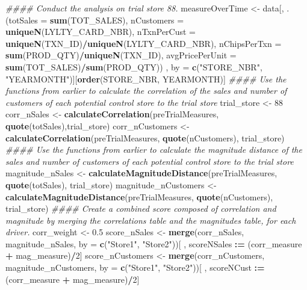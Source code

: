 \documentclass[
]{article}
\newenvironment{Shaded}{\begin{snugshade}}{\end{snugshade}}
\newcommand{\CommentTok}[1]{\textcolor[rgb]{0.56,0.35,0.01}{\textit{#1}}}
\newcommand{\DataTypeTok}[1]{\textcolor[rgb]{0.13,0.29,0.53}{#1}}
\newcommand{\DecValTok}[1]{\textcolor[rgb]{0.00,0.00,0.81}{#1}}
\newcommand{\ErrorTok}[1]{\textcolor[rgb]{0.64,0.00,0.00}{\textbf{#1}}}
\newcommand{\FloatTok}[1]{\textcolor[rgb]{0.00,0.00,0.81}{#1}}
\newcommand{\KeywordTok}[1]{\textcolor[rgb]{0.13,0.29,0.53}{\textbf{#1}}}
\newcommand{\NormalTok}[1]{#1}
\newcommand{\OperatorTok}[1]{\textcolor[rgb]{0.81,0.36,0.00}{\textbf{#1}}}
\newcommand{\StringTok}[1]{\textcolor[rgb]{0.31,0.60,0.02}{#1}}
\begin{document}
\begin{Shaded}
\begin{Highlighting}[]
\CommentTok{#### Conduct the analysis on trial store 88.}
\NormalTok{measureOverTime <-}\StringTok{ }\NormalTok{data[, .(}\DataTypeTok{totSales =} \KeywordTok{sum}\NormalTok{(TOT_SALES),}
\DataTypeTok{nCustomers =} \KeywordTok{uniqueN}\NormalTok{(LYLTY_CARD_NBR),}
\DataTypeTok{nTxnPerCust =} \KeywordTok{uniqueN}\NormalTok{(TXN_ID)}\OperatorTok{/}\KeywordTok{uniqueN}\NormalTok{(LYLTY_CARD_NBR),}
\DataTypeTok{nChipsPerTxn =} \KeywordTok{sum}\NormalTok{(PROD_QTY)}\OperatorTok{/}\KeywordTok{uniqueN}\NormalTok{(TXN_ID),}
\DataTypeTok{avgPricePerUnit =} \KeywordTok{sum}\NormalTok{(TOT_SALES)}\OperatorTok{/}\KeywordTok{sum}\NormalTok{(PROD_QTY))}
\NormalTok{, by =}\StringTok{ }\KeywordTok{c}\NormalTok{(}\StringTok{"STORE_NBR"}\NormalTok{, }\StringTok{"YEARMONTH"}\NormalTok{)][}\KeywordTok{order}\NormalTok{(STORE_NBR, YEARMONTH)]}
\CommentTok{#### Use the functions from earlier to calculate the correlation of the sales and number of customers of each potential control store to the trial store}
\NormalTok{trial_store <-}\StringTok{ }\DecValTok{88}
\NormalTok{corr_nSales <-}\StringTok{ }\KeywordTok{calculateCorrelation}\NormalTok{(preTrialMeasures, }\KeywordTok{quote}\NormalTok{(totSales),trial_store)}
\NormalTok{corr_nCustomers <-}\StringTok{ }\KeywordTok{calculateCorrelation}\NormalTok{(preTrialMeasures, }\KeywordTok{quote}\NormalTok{(nCustomers), trial_store)}
\CommentTok{#### Use the functions from earlier to calculate the magnitude distance of the sales and number of customers of each potential control store to the trial store}
\NormalTok{magnitude_nSales <-}\StringTok{ }\KeywordTok{calculateMagnitudeDistance}\NormalTok{(preTrialMeasures, }\KeywordTok{quote}\NormalTok{(totSales), trial_store)}
\NormalTok{magnitude_nCustomers <-}\StringTok{ }\KeywordTok{calculateMagnitudeDistance}\NormalTok{(preTrialMeasures, }\KeywordTok{quote}\NormalTok{(nCustomers), trial_store)}
\CommentTok{#### Create a combined score composed of correlation and magnitude by merging the correlations table and the magnitudes table, for each driver.}
\NormalTok{corr_weight <-}\StringTok{ }\FloatTok{0.5}
\NormalTok{score_nSales <-}\StringTok{ }\KeywordTok{merge}\NormalTok{(corr_nSales, magnitude_nSales, }\DataTypeTok{by =} \KeywordTok{c}\NormalTok{(}\StringTok{"Store1"}\NormalTok{, }\StringTok{"Store2"}\NormalTok{))[ , scoreNSales }\OperatorTok{:}\ErrorTok{=}\StringTok{ }\NormalTok{(corr_measure }\OperatorTok{+}\StringTok{ }\NormalTok{mag_measure)}\OperatorTok{/}\DecValTok{2}\NormalTok{]}
\NormalTok{score_nCustomers <-}\StringTok{ }\KeywordTok{merge}\NormalTok{(corr_nCustomers, magnitude_nCustomers, }\DataTypeTok{by =} \KeywordTok{c}\NormalTok{(}\StringTok{"Store1"}\NormalTok{, }\StringTok{"Store2"}\NormalTok{))[ , scoreNCust }\OperatorTok{:}\ErrorTok{=}\StringTok{ }\NormalTok{(corr_measure }\OperatorTok{+}\StringTok{ }\NormalTok{mag_measure)}\OperatorTok{/}\DecValTok{2}\NormalTok{]}


\end{Highlighting}
\end{Shaded}
\end{document}
